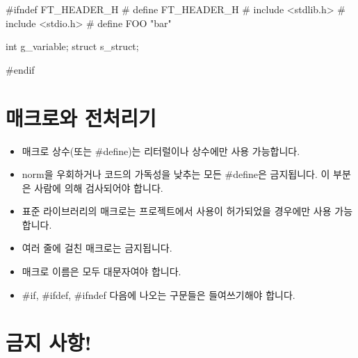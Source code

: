 \documentclass{42-ko}
\begin{document}
        \begin{42ccode}
#ifndef FT_HEADER_H
# define FT_HEADER_H
# include <stdlib.h>
# include <stdio.h>
# define FOO "bar"

int		g_variable;
struct	s_struct;

#endif
        \end{42ccode}
        \newpage

    \section{매크로와 전처리기}

        \begin{itemize}

            \item 매크로 상수(또는 #define)는 리터럴이나 상수에만 사용 가능합니다.
            \item norm을 우회하거나 코드의 가독성을 낮추는 모든 #define은 금지됩니다.
                이 부분은 사람에 의해 검사되어야 합니다.
            \item 표준 라이브러리의 매크로는 프로젝트에서 사용이 허가되었을 경우에만 사용 가능합니다.
            \item 여러 줄에 걸친 매크로는 금지됩니다.
            \item 매크로 이름은 모두 대문자여야 합니다.
            \item #if, #ifdef, #ifndef 다음에 나오는 구문들은 들여쓰기해야 합니다.

        \end{itemize}
        \newpage


    \section{금지 사항!}
\end{document}
